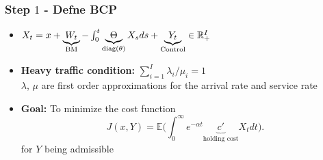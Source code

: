 \documentclass{beamer}
\newcommand{\diag}{{\rm diag}}
\begin{document}




\begin{frame}
  \frametitle{Step $1$ - Defne BCP}

  \vfill
  \begin{itemize}[<+->]
  \item $X_t=x+\underbrace{W_t}_\text{BM}-\int_0^t \underbrace{\Theta}_\text{$\diag(\theta)$} X_s ds +\underbrace{Y_t}_\text{Control}\in \mathbb{R}^I_{+}$
    \vfill
  \item {\bf Heavy traffic condition:} $\sum_{i=1}^I \lambda_i/\mu_i=1$\\
    {\small $\lambda$, $\mu$ are first order approximations for the arrival rate and service rate}
    \vfill
  \item {\bf Goal:} To minimize the cost function 
    \begin{equation*}\label{cost}
      J(x,Y)=\mathbb{E} \Big(\int_{0}^{\infty} e^{-\alpha t} \underbrace{c'}_\text{holding cost} X_t dt\Big).
    \end{equation*}
    for $Y$ being admissible

  \end{itemize}
  \vfill



\end{frame}
\end{document}
